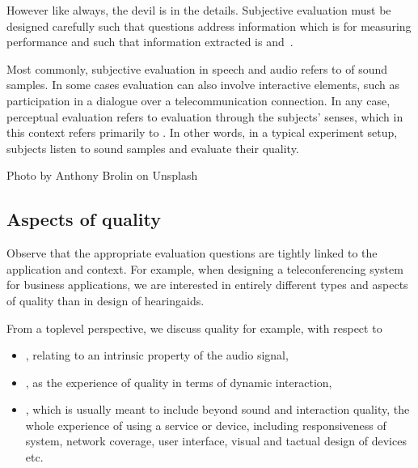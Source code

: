 \documentclass[letterpaper,10pt,english]{jupyterBook}
\begin{document}
\sphinxAtStartPar
However like always, the devil is in the details. Subjective evaluation
must be designed carefully such that questions address information which
is  for measuring performance and such that information
extracted is  and .

\sphinxAtStartPar
Most commonly, subjective evaluation in speech and audio refers to
 of sound samples. In some cases evaluation can
also involve interactive elements, such as participation in a dialogue
over a telecommunication connection. In any case, perceptual evaluation
refers to evaluation through the subjects’ senses, which in this context
refers primarily to . In other words, in a typical experiment
setup, subjects listen to sound samples and evaluate their quality.

\sphinxAtStartPar
{}

\sphinxAtStartPar
Photo by Anthony Brolin on Unsplash


\subsection{Aspects of quality}
\label{\detokenize{Evaluation/Subjective_quality_evaluation:aspects-of-quality}}
\sphinxAtStartPar
Observe that the appropriate evaluation questions are tightly linked to
the application and context. For example, when designing a
teleconferencing system for business applications, we are interested in
entirely different types and aspects of quality than in design of
hearing\sphinxhyphen{}aids.

\sphinxAtStartPar
From a top\sphinxhyphen{}level perspective, we discuss quality for example, with
respect to
\begin{itemize}
\item {} 
\sphinxAtStartPar
{}, relating to an intrinsic property of the
audio signal,

\item {} 
\sphinxAtStartPar
{}, as the experience of
quality in terms of dynamic interaction,

\item {} 
\sphinxAtStartPar
{}, which is usually meant to
include beyond sound and interaction quality, the whole experience
of using a service or device, including responsiveness of system,
network coverage, user interface, visual and tactual design of
devices etc.

\end{itemize}
\end{document}
